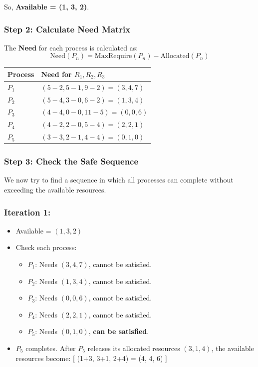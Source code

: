 \documentclass[a4paper]{book}
\begin{document}
So, \textbf{Available = (1, 3, 2)}.

\hrulefill

\subsubsection{Step 2: Calculate Need Matrix}

The \textbf{Need} for each process is calculated as:
\[
\text{Need}(P_n) = \text{MaxRequire}(P_n) - \text{Allocated}(P_n)
\]

\begin{tabular}{l l}
Process & Need for \( R_1, R_2, R_3 \) \\
\hline
\( P_1 \) & \( (5-2, 5-1, 9-2) = (3, 4, 7) \) \\
\( P_2 \) & \( (5-4, 3-0, 6-2) = (1, 3, 4) \) \\
\( P_3 \) & \( (4-4, 0-0, 11-5) = (0, 0, 6) \) \\
\( P_4 \) & \( (4-2, 2-0, 5-4) = (2, 2, 1) \) \\
\( P_5 \) & \( (3-3, 2-1, 4-4) = (0, 1, 0) \) \\
\end{tabular}

\hrulefill

\subsubsection{Step 3: Check the Safe Sequence}

We now try to find a sequence in which all processes can complete without exceeding the available resources.

\subsubsection{Iteration 1:}
\begin{itemize}
\item 
Available = \( (1, 3, 2) \)

\item 
Check each process:
\begin{itemize}
\item 
\( P_1 \): Needs \( (3, 4, 7) \), cannot be satisfied.

\item 
\( P_2 \): Needs \( (1, 3, 4) \), cannot be satisfied.

\item 
\( P_3 \): Needs \( (0, 0, 6) \), cannot be satisfied.

\item 
\( P_4 \): Needs \( (2, 2, 1) \), cannot be satisfied.

\item 
\( P_5 \): Needs \( (0, 1, 0) \), \textbf{can be satisfied}.

\end{itemize}

\item 
\( P_5 \) completes. After \( P_5 \) releases its allocated resources \( (3, 1, 4) \), the available resources become:
[
(1+3, 3+1, 2+4) = (4, 4, 6)
]

\end{itemize}
\end{document}
